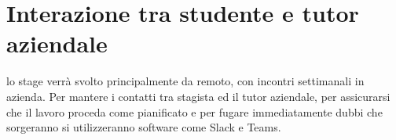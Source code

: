 \section*{Interazione tra studente e tutor aziendale}

lo stage verrà svolto principalmente da remoto, con incontri settimanali in azienda. Per mantere i contatti tra stagista ed il tutor aziendale, per assicurarsi che il lavoro proceda come pianificato e per fugare immediatamente dubbi che
sorgeranno si utilizzeranno software come Slack e Teams.
